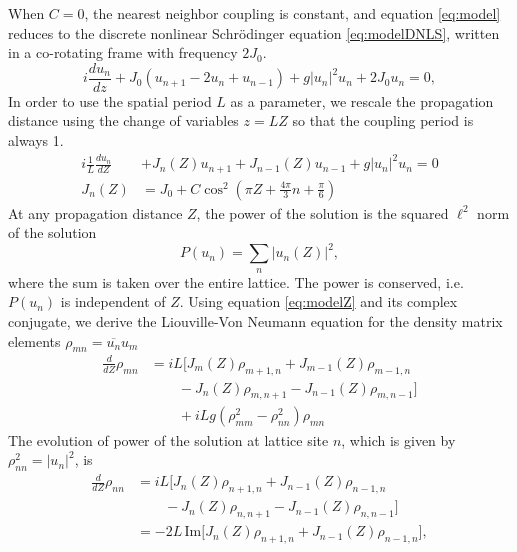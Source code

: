\documentclass[reprint, amsmath,amssymb,aps,pre]{revtex4-2}
\begin{document}
When $C = 0$, the nearest neighbor coupling is constant, and equation \cref{eq:model} reduces to the discrete nonlinear Schr\"odinger equation \cref{eq:modelDNLS}, written in a co-rotating frame with frequency $2 J_0$.
\begin{equation}\label{eq:modelDNLS}
i \frac{d u_n}{d z} + J_0( u_{n+1} - 2 u_n + u_{n-1}) + g|u_n|^2 u_n + 2 J_0 u_n = 0,
\end{equation}
In order to use the spatial period $L$ as a parameter, we rescale the propagation distance using the change of variables $z = L Z$ so that the coupling period is always 1.
\begin{equation}\label{eq:modelZ}
\begin{aligned}
i \frac{1}{L} \frac{d u_n}{d Z} &+ J_n(Z) u_{n+1} + J_{n-1}(Z)u_{n-1} + g|u_n|^2 u_n = 0 \\
J_n(Z) &= J_0 + C \cos^2\left( \pi Z + \frac{4 \pi}{3} n + \frac{\pi}{6} \right)
\end{aligned}
\end{equation}
At any propagation distance $Z$, the power of the solution is the squared $\ell^2$ norm of the solution
\begin{equation}
P(u_n) = \sum_{n} | u_n(Z) |^2,
\end{equation} 
where the sum is taken over the entire lattice. The power is conserved, i.e. $P(u_n)$ is independent of $Z$. Using equation \cref{eq:modelZ} and its complex conjugate, we derive the Liouville-Von Neumann equation for the density matrix elements $\rho_{mn} = \overline{u_n} u_m$
\begin{equation}\label{eq:rhoeq}
\begin{aligned}
\frac{d}{dZ} \rho_{mn} &= iL \Big[ J_m(Z) \rho_{m+1,n} + J_{m-1}(Z) \rho_{m-1,n} \\
&\qquad -J_n(Z) \rho_{m,n+1} - J_{n-1}(Z) \rho_{m,n-1} \big] \\
&\qquad + iLg\left( \rho_{mm}^2 - \rho_{nn}^2 \right) \rho_{mn}
\end{aligned}
\end{equation}
The evolution of power of the solution at lattice site $n$, which is given by $\rho_{nn}^2 = | u_n |^2$, is
\begin{equation}\label{eq:powerevol}
\begin{aligned}
\frac{d}{dZ} \rho_{nn} &= iL \Big[ J_n(Z) \rho_{n+1,n} + J_{n-1}(Z) \rho_{n-1,n} \\
&\qquad -J_n(Z) \rho_{n,n+1} - J_{n-1}(Z) \rho_{n,n-1} \big] \\
&= -2L\,\text{Im}\Big[ J_n(Z) \rho_{n+1,n} + J_{n-1}(Z) \rho_{n-1,n} \Big],
\end{aligned}
\end{equation}
\end{document}
